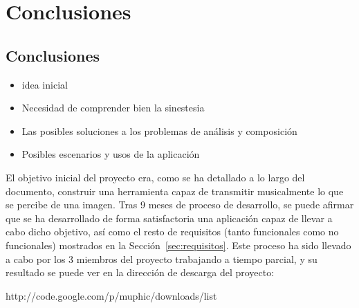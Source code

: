 \chapter{Conclusiones}





\section{Conclusiones}


\begin{itemize}
	
	\item idea inicial
	\item Necesidad de comprender bien la sinestesia
	\item Las posibles soluciones a los problemas de análisis y composición
	\item Posibles escenarios y usos de la aplicación

\end{itemize}

El objetivo inicial del proyecto era, como se ha detallado a lo largo del documento, construir una herramienta capaz de transmitir musicalmente lo que se percibe de una imagen. Tras 9 meses de proceso de desarrollo, se puede afirmar que se ha desarrollado de forma satisfactoria una aplicación capaz de llevar a cabo dicho objetivo, así como el resto de requisitos (tanto funcionales como no funcionales) mostrados en la Sección~\ref{sec:requisitos}. Este proceso ha sido llevado a cabo por los 3 miembros del proyecto trabajando a tiempo parcial, y su resultado se puede ver en la dirección de descarga del proyecto:\\

\begin{center}
http://code.google.com/p/muphic/downloads/list
\end{center}



